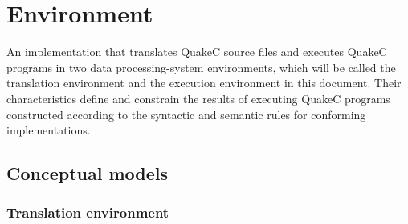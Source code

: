 \documentclass{article}
\begin{document}
\section{Environment}
An implementation that translates QuakeC source files and executes QuakeC programs in two
data processing-system environments, which will be called the translation environment and
the execution environment in this document. Their characteristics define and constrain the
results of executing QuakeC programs constructed according to the syntactic and semantic
rules for conforming implementations.
\subsection{Conceptual models}
\subsubsection{Translation environment}
\end{document}
